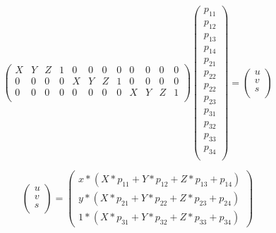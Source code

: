 \documentclass[11pt,a4paper,titlepage,oneside]{report}
\begin{document}
\setcounter{MaxMatrixCols}{15}
\begin{equation}\label{eq:projection_flat}
	\begin{pmatrix}
		X & Y & Z & 1 & 0 & 0 & 0 & 0 & 0 & 0 & 0 & 0\\
		0 & 0 & 0 & 0 & X & Y & Z & 1 & 0 & 0 & 0 & 0\\
		0 & 0 & 0 & 0 & 0 & 0 & 0 & 0 & X & Y & Z & 1\\
	\end{pmatrix}
	\begin{pmatrix}p_{11}\\
		p_{12}\\
		p_{13}\\
		p_{14}\\
		p_{21}\\
		p_{22}\\
		p_{22}\\
		p_{23}\\
		p_{31}\\
		p_{32}\\
		p_{33}\\
		p_{34} \\
	\end{pmatrix}=
	\begin{pmatrix}u\\
		v\\
		s\\
	\end{pmatrix}
\end{equation}

\begin{equation}\label{eq:projection_flat_s}
	\begin{pmatrix}u\\
		v\\
		s\\
	\end{pmatrix}=\begin{pmatrix}
		x*(X*p_{11}+Y*p_{12}+Z*p_{13}+p_{14})\\
		y*(X*p_{21}+Y*p_{22}+Z*p_{23}+p_{24})\\
		1*(X*p_{31}+Y*p_{32}+Z*p_{33}+p_{34})
	\end{pmatrix}
\end{equation}
\end{document}
